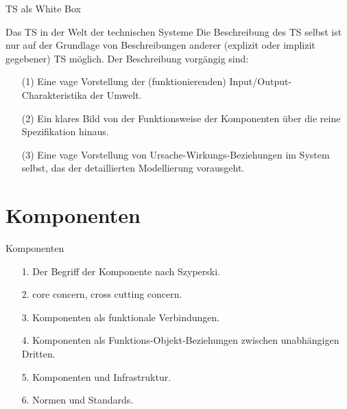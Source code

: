 \documentclass{beamer}
\begin{document}
\begin{frame}{TS als White Box}
  \begin{block}{Das TS in der Welt der technischen Systeme}
    Die Beschreibung des TS selbst ist nur auf der Grundlage von
    Beschreibungen anderer (explizit oder implizit gegebener) TS möglich.  Der
    Beschreibung vorgängig sind:
    \begin{itemize}
    \item[(1)] Eine vage Vorstellung der (funktionierenden)
      Input/Output-Charakteristika der Umwelt.
    \item [(2)] Ein klares Bild von der Funktionsweise der Komponenten über
      die reine Spezifikation hinaus.
    \item [(3)] Eine vage Vorstellung von Ursache-Wirkungs-Beziehungen im
      System selbst, das der detaillierten Modellierung vorausgeht.
    \end{itemize}
  \end{block}
\end{frame}
\section{Komponenten}
\begin{frame}{Komponenten}
  \begin{itemize}
  \item [1.] Der Begriff der Komponente nach Szyperski.
  \item [2.] core concern, cross cutting concern.
  \item [3.] Komponenten als funktionale Verbindungen.
  \item [4.] Komponenten als Funktions-Objekt-Beziehungen zwischen
    unabhängigen Dritten.
  \item [5.] Komponenten und Infrastruktur.
  \item [6.] Normen und Standards.
  \end{itemize}
\end{frame}
\end{document}

